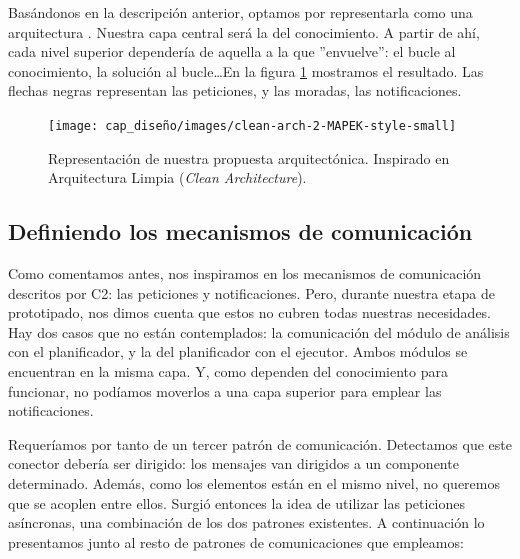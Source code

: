 Basándonos en la descripción anterior, optamos por representarla como una arquitectura  \cite{taylorSoftwareArchitectureFoundations2009}. Nuestra capa central será la del conocimiento. A partir de ahí, cada nivel superior dependería de aquella a la que ''envuelve'': el bucle al conocimiento, la solución al bucle\dots En la figura \ref{fig:clean-mapek-architecture} mostramos el resultado. Las flechas negras representan las peticiones, y las moradas, las notificaciones.

\begin{figure}[htb]
  \centering
  \texttt{[image: cap\_diseño/images/clean-arch-2-MAPEK-style-small]}
  \caption[Representación de nuestra propuesta arquitectónica. Inspirado en Arquitectura Limpia (\emph{Clean Architecture}).]{Representación de nuestra propuesta arquitectónica. Inspirado en Arquitectura Limpia (\emph{Clean Architecture}). \footnotemark }
  \label{fig:clean-mapek-architecture}
\end{figure}


\subsection{Definiendo los mecanismos de comunicación}

Como comentamos antes, nos inspiramos en los mecanismos de comunicación descritos por C2: las peticiones y notificaciones. Pero, durante nuestra etapa de prototipado, nos dimos cuenta que estos no cubren todas nuestras necesidades. Hay dos casos que no están contemplados: la comunicación del módulo de análisis con el planificador, y la del planificador con el ejecutor. Ambos módulos se encuentran en la misma capa. Y, como dependen del conocimiento para funcionar, no podíamos moverlos a una capa superior para emplear las notificaciones.

Requeríamos por tanto de un tercer patrón de comunicación. Detectamos que este conector debería ser dirigido: los mensajes van dirigidos a un componente determinado. Además, como los elementos están en el mismo nivel, no queremos que se acoplen entre ellos. Surgió entonces la idea de utilizar las peticiones asíncronas, una combinación de los dos patrones existentes. A continuación lo presentamos junto al resto de patrones de comunicaciones que empleamos:

